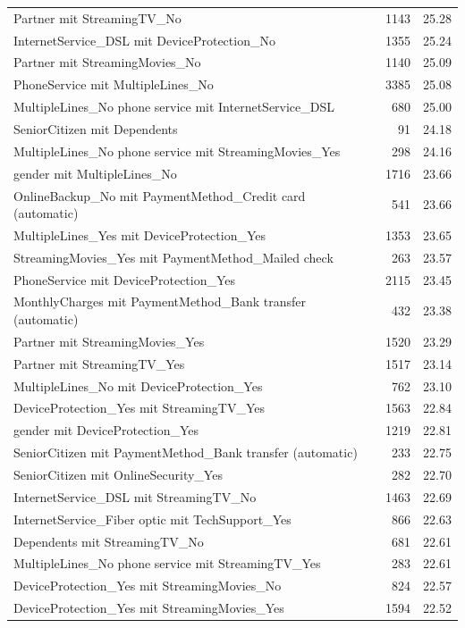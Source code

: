 \documentclass[a4paper,11pt]{article}
\begin{document}
\begin{longtable}{p{9cm}rr}
Partner mit StreamingTV\_No & 1143 & 25.28 \\
InternetService\_DSL mit DeviceProtection\_No & 1355 & 25.24 \\
Partner mit StreamingMovies\_No & 1140 & 25.09 \\
PhoneService mit MultipleLines\_No & 3385 & 25.08 \\
MultipleLines\_No phone service mit InternetService\_DSL & 680 & 25.00 \\
SeniorCitizen mit Dependents & 91 & 24.18 \\
MultipleLines\_No phone service mit StreamingMovies\_Yes & 298 & 24.16 \\
gender mit MultipleLines\_No & 1716 & 23.66 \\
OnlineBackup\_No mit PaymentMethod\_Credit card (automatic) & 541 & 23.66 \\
MultipleLines\_Yes mit DeviceProtection\_Yes & 1353 & 23.65 \\
StreamingMovies\_Yes mit PaymentMethod\_Mailed check & 263 & 23.57 \\
PhoneService mit DeviceProtection\_Yes & 2115 & 23.45 \\
MonthlyCharges mit PaymentMethod\_Bank transfer (automatic) & 432 & 23.38 \\
Partner mit StreamingMovies\_Yes & 1520 & 23.29 \\
Partner mit StreamingTV\_Yes & 1517 & 23.14 \\
MultipleLines\_No mit DeviceProtection\_Yes & 762 & 23.10 \\
DeviceProtection\_Yes mit StreamingTV\_Yes & 1563 & 22.84 \\
gender mit DeviceProtection\_Yes & 1219 & 22.81 \\
SeniorCitizen mit PaymentMethod\_Bank transfer (automatic) & 233 & 22.75 \\
SeniorCitizen mit OnlineSecurity\_Yes & 282 & 22.70 \\
InternetService\_DSL mit StreamingTV\_No & 1463 & 22.69 \\
InternetService\_Fiber optic mit TechSupport\_Yes & 866 & 22.63 \\
Dependents mit StreamingTV\_No & 681 & 22.61 \\
MultipleLines\_No phone service mit StreamingTV\_Yes & 283 & 22.61 \\
DeviceProtection\_Yes mit StreamingMovies\_No & 824 & 22.57 \\
DeviceProtection\_Yes mit StreamingMovies\_Yes & 1594 & 22.52 \\

\end{longtable}
\end{document}
